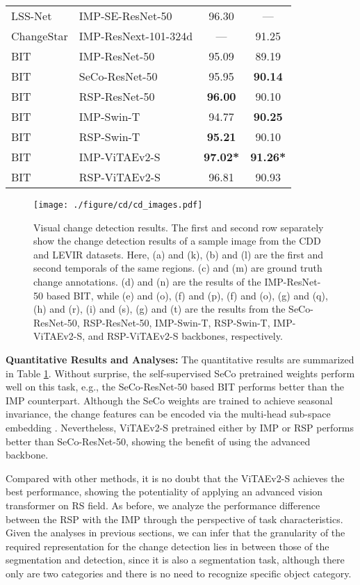 \documentclass[10pt, journal,twoside]{IEEEtran}
\begin{document}
\begin{table}[t]
\begin{tabular}{l|l|c|c}
 LSS-Net \cite{acd_2021_jstars_lssnet}& IMP-SE-ResNet-50 & 96.30 & --- \\
 ChangeStar \cite{changestar} & IMP-ResNext-101-324d & --- & 91.25 \\
  \hline
  BIT  & IMP-ResNet-50 & 95.09 & 89.19\\
  BIT  & SeCo-ResNet-50 & 95.95 &\bfseries 90.14 \\
  BIT  & RSP-ResNet-50 &\bfseries 96.00 & 90.10 \\
  \hline
  BIT  & IMP-Swin-T & 94.77 &\bfseries 90.25 \\
  BIT  & RSP-Swin-T &\bfseries 95.21 & 90.10 \\
  \hline
  BIT  & IMP-ViTAEv2-S & \bfseries 97.02\textbf{*} & \bfseries 91.26\textbf{*} \\
  BIT  & RSP-ViTAEv2-S & 96.81 & 90.93 \\
  \hline
\end{tabular}
  \label{cd_cdd_levir}
\end{table}

\begin{figure*}[t]
  \centering
  \texttt{[image: ./figure/cd/cd\_images.pdf]}

  \caption{Visual change detection results. The first and second row separately show the change detection results of a sample image from the CDD and LEVIR datasets. Here, (a) and (k), (b) and (l) are the first and second temporals of the same regions. (c) and (m) are ground truth change annotations. (d) and (n) are the results of the IMP-ResNet-50 based BIT, while (e) and (o), (f) and (p), (f) and (o), (g) and (q), (h) and (r), (i) and (s), (g) and (t) are the results from the SeCo-ResNet-50, RSP-ResNet-50, IMP-Swin-T, RSP-Swin-T, IMP-ViTAEv2-S, and RSP-ViTAEv2-S backbones, respectively.}
  \label{cd_maps}
\end{figure*}

\textbf{Quantitative Results and Analyses:} The quantitative results are summarized in Table \ref{cd_cdd_levir}. Without surprise, the self-supervised SeCo pretrained weights perform well on this task, e.g., the SeCo-ResNet-50 based BIT performs better than the IMP counterpart. Although the SeCo weights are trained to achieve seasonal invariance, the change features can be encoded via the multi-head sub-space embedding \cite{seco}. Nevertheless, ViTAEv2-S pretrained either by IMP or RSP performs better than SeCo-ResNet-50, showing the benefit of using the advanced backbone.

Compared with other methods, it is no doubt that the ViTAEv2-S achieves the best performance, showing the potentiality of applying an advanced vision transformer on RS field. As before, we analyze the performance difference between the RSP with the IMP through the perspective of task characteristics. Given the analyses in previous sections, we can infer that the granularity of the required representation for the change detection lies in between those of the segmentation and detection, since it is also a segmentation task, although there only are two categories and there is no need to recognize specific object category. 
\end{document}
